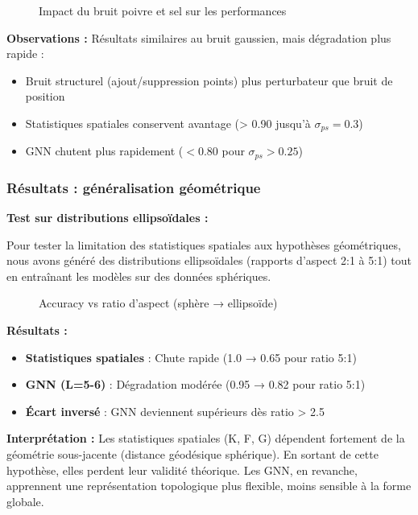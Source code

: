 \begin{figure}[h]
\centering
\caption{Impact du bruit poivre et sel sur les performances}
\label{fig:noise_pepper}
\end{figure}

\textbf{Observations :}
Résultats similaires au bruit gaussien, mais dégradation plus rapide :
\begin{itemize}
    \item Bruit structurel (ajout/suppression points) plus perturbateur que bruit de position
    \item Statistiques spatiales conservent avantage (> 0.90 jusqu'à $\sigma_{ps}=0.3$)
    \item GNN chutent plus rapidement ($< 0.80$ pour $\sigma_{ps} > 0.25$)
\end{itemize}

\subsubsection{Résultats : généralisation géométrique}

\textbf{Test sur distributions ellipsoïdales :}

Pour tester la limitation des statistiques spatiales aux hypothèses géométriques, nous avons généré des distributions ellipsoïdales (rapports d'aspect 2:1 à 5:1) tout en entraînant les modèles sur des données sphériques.

\begin{figure}[h]
    \centering
\caption{Accuracy vs ratio d'aspect (sphère → ellipsoïde)}
\label{fig:ratio_aspect}
\end{figure}

\textbf{Résultats :}
\begin{itemize}
    \item \textbf{Statistiques spatiales} : Chute rapide (1.0 → 0.65 pour ratio 5:1)
    \item \textbf{GNN (L=5-6)} : Dégradation modérée (0.95 → 0.82 pour ratio 5:1)
    \item \textbf{Écart inversé} : GNN deviennent supérieurs dès ratio > 2.5
\end{itemize}

\textbf{Interprétation :}
Les statistiques spatiales (K, F, G) dépendent fortement de la géométrie sous-jacente (distance géodésique sphérique). En sortant de cette hypothèse, elles perdent leur validité théorique. Les GNN, en revanche, apprennent une représentation topologique plus flexible, moins sensible à la forme globale.

